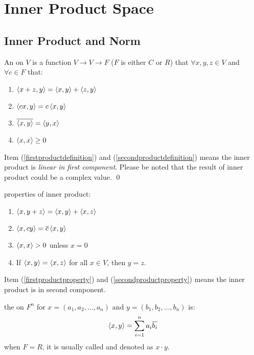 \section{Inner Product Space}


\subsection{Inner Product and Norm}

\begin{definition}
	An  on $V$ is a function $V \rightarrow V \rightarrow F$ ($F$ is either $C$ or $R$) that $\forall x,y,z \in V$ and $\forall c \in F$ that:
	\begin{enumerate}
		\item $\left\langle \displaystyle x+z, y \right\rangle = \left\langle \displaystyle x, y \right\rangle + \left\langle \displaystyle z, y \right\rangle$ \label{firstproductdefinition}
		\item $\left\langle \displaystyle cx, y \right\rangle = c \left\langle \displaystyle x, y \right\rangle$ \label{secondproductdefinition}
		\item $\overline{\left\langle \displaystyle x, y \right\rangle} = \left\langle \displaystyle y, x \right\rangle$
		\item $\left\langle \displaystyle x, x \right\rangle \geq 0$
	\end{enumerate}
	Item (\ref{firstproductdefinition}) and (\ref{secondproductdefinition}) means the inner product is \emph{linear in first component}.
	Please be noted that the result of inner product could be a complex value.
	\qed
\end{definition}


\begin{theorem}
	properties of inner product:
	\begin{enumerate}
		\item $\left\langle \displaystyle x, y+z \right\rangle = \left\langle \displaystyle x, y \right\rangle + \left\langle \displaystyle x, z \right\rangle$ \label{firstproductproperty}
		\item $\left\langle \displaystyle x, cy \right\rangle = \overline{c} \left\langle \displaystyle x, y \right\rangle $ \label{secondproductproperty}
		\item $\left\langle \displaystyle x, x \right\rangle > 0$ unless $x=0$
		\item If $\left\langle \displaystyle x, y \right\rangle = \left\langle \displaystyle x, z \right\rangle$ for all $x \in V$, then $y=z$.
	\end{enumerate}
	Item (\ref{firstproductproperty}) and (\ref{secondproductproperty}) means the inner product is  in second component.
\end{theorem}


\begin{definition}
	the  on $F^n$ for $x=(a_1,a_2,\dots,a_n)$ and $y=(b_1,b_2,\dots,b_n)$ is:
	\begin{equation}
		\left\langle \displaystyle x, y \right\rangle = \sum_{i=1}^n a_i \overline{b_i}		
	\end{equation}
	when $F=R$, it is usually called  and denoted as $x \cdot y$.
\end{definition}

